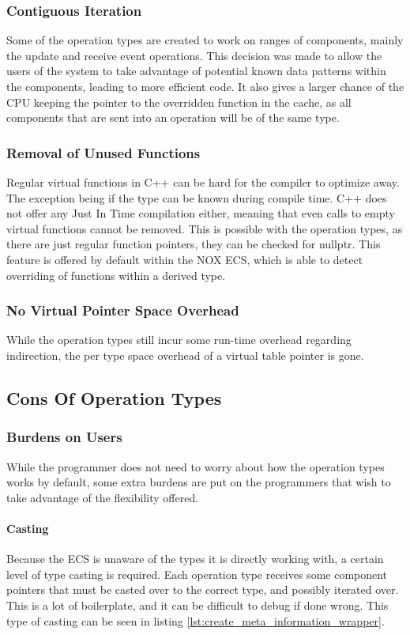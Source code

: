 \subsubsection{Contiguous Iteration}
Some of the operation types are created to work on ranges of components, mainly the update and receive event operations.
This decision was made to allow the users of the system to take advantage of potential known data patterns within the components, leading to more efficient code.
It also gives a larger chance of the CPU keeping the pointer to the overridden function in the cache, as all components that are sent into an operation will be of the same type.

\subsubsection{Removal of Unused Functions}
Regular virtual functions in C++ can be hard for the compiler to optimize away.
The exception being if the type can be known during compile time.
C++ does not offer any Just In Time compilation either, meaning that even calls to empty virtual functions cannot be removed.
This is possible with the operation types, as there are just regular function pointers, they can be checked for nullptr.
This feature is offered by default within the NOX ECS, which is able to detect overriding of functions within a derived type.

\subsubsection{No Virtual Pointer Space Overhead}
While the operation types still incur some run-time overhead regarding indirection, the per type space overhead of a virtual table pointer is gone.

\subsection{Cons Of Operation Types}
\subsubsection{Burdens on Users}
While the programmer does not need to worry about how the operation types works by default,
some extra burdens are put on the programmers that wish to take advantage of the flexibility offered.

\paragraph{Casting}
Because the ECS is unaware of the types it is directly working with, a certain level of type casting is required.
Each operation type receives some component pointers that must be casted over to the correct type, and possibly iterated over.
This is a lot of boilerplate, and it can be difficult to debug if done wrong. This type of casting can be seen in listing \ref{lst:create_meta_information_wrapper}.

